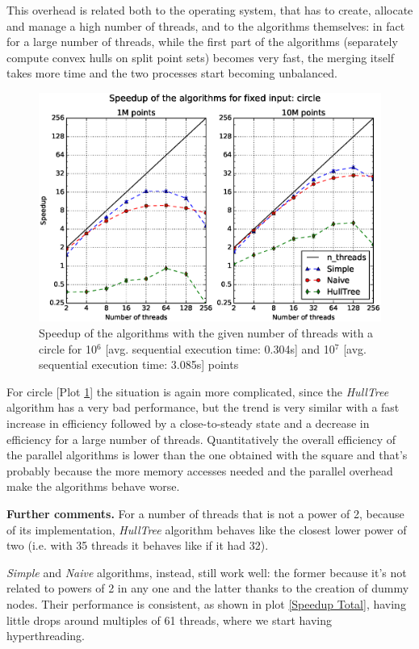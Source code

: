 \documentclass[letterpaper]{article}
\newcommand{\mypar}[1]{{\bf #1.}}
\theoremstyle{definition}
\begin{document}
This overhead is related both to the operating system, that has to create, allocate and manage a high number of threads, and to the algorithms themselves:
in fact for a large number of threads, while the first part of the algorithms (separately compute convex hulls on split point sets) becomes very fast, the merging itself takes more time and the two processes start becoming unbalanced.

\begin{figure}[!ht]\centering
  \includegraphics[scale=0.33]{./plots/speedup_xeon_circle_fixed_points.eps}
  \caption{Speedup of the algorithms with the given number of threads with a circle for 10$^6$ [avg. sequential execution time: 0.304s] and 10$^7$ [avg. sequential execution time: 3.085s] points\label{Threads speedup circle}}
\end{figure}

For circle [Plot \ref{Threads speedup circle}] the situation is again more complicated, since the \textit{HullTree} algorithm has a very bad performance, but the trend is very similar with a fast increase in efficiency followed by a close-to-steady state and a decrease in efficiency for a large number of threads.
Quantitatively the overall efficiency of the parallel algorithms is lower than the one obtained with the square and that's probably because the more memory accesses needed and the parallel overhead make the algorithms behave worse.

\mypar{Further comments}
For a number of threads that is not a power of 2, because of its implementation, \textit{HullTree} algorithm behaves like the closest lower power of two (i.e. with 35 threads it behaves like if it had 32).

\textit{Simple} and \textit{Naive} algorithms, instead, still work well: the former because it's not related to powers of 2 in any one and the latter thanks to the creation of dummy nodes. Their performance is consistent, as shown in plot \ref{Speedup Total}, having little drops around multiples of 61 threads, where we start having hyperthreading.
\end{document}
